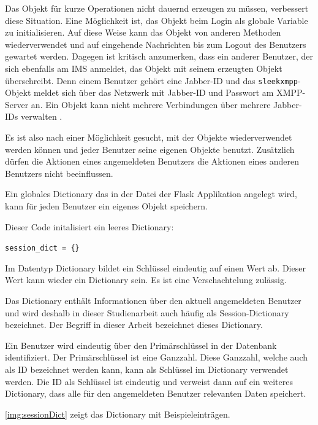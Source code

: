 \documentclass[a4paper,titlepage,halfparskip,12pt]{scrreprt}
\begin{document}
\begin{onehalfspacing}
Das Objekt für kurze Operationen nicht dauernd erzeugen zu müssen, verbessert diese Situation. Eine Möglichkeit ist, das Objekt beim Login als globale Variable zu initialisieren. Auf diese Weise kann das Objekt von anderen Methoden wiederverwendet und auf eingehende Nachrichten bis zum Logout des Benutzers gewartet werden. Dagegen ist kritisch anzumerken, dass ein anderer Benutzer, der sich ebenfalls am \acs{IMS} anmeldet, das Objekt mit seinem erzeugten Objekt überschreibt. Denn einem Benutzer gehört eine Jabber-ID und das \texttt{sleekxmpp}-Objekt meldet sich über das Netzwerk mit Jabber-ID und Passwort am \acs{XMPP}-Server an. Ein Objekt kann nicht mehrere Verbindungen über mehrere Jabber-IDs verwalten \cite{pythonSleekxmpp}.

Es ist also nach einer Möglichkeit gesucht, mit der Objekte wiederverwendet werden können und jeder Benutzer seine eigenen Objekte benutzt. Zusätzlich dürfen die Aktionen eines angemeldeten Benutzers die Aktionen eines anderen Benutzers nicht beeinflussen.

Ein globales Dictionary das in der Datei der Flask Applikation angelegt wird, kann für jeden Benutzer ein eigenes Objekt speichern.

Dieser Code initalisiert ein leeres Dictionary:

\texttt{session\_dict = \{\}}

Im Datentyp Dictionary bildet ein Schlüssel eindeutig auf einen Wert ab. Dieser Wert kann wieder ein Dictionary sein. Es ist eine Verschachtelung zulässig.\cite{pythonDictionaries}

Das Dictionary enthält Informationen über den aktuell angemeldeten Benutzer und wird deshalb in dieser Studienarbeit auch häufig als Session-Dictionary bezeichnet. Der Begriff in dieser Arbeit bezeichnet dieses Dictionary.

Ein Benutzer wird eindeutig über den Primärschlüssel in der Datenbank identifiziert. Der Primärschlüssel ist eine Ganzzahl. Diese Ganzzahl, welche auch als ID bezeichnet werden kann, kann als Schlüssel im Dictionary verwendet werden. Die ID als Schlüssel ist eindeutig und verweist dann auf ein weiteres Dictionary, dass alle für den angemeldeten Benutzer relevanten Daten speichert.

\pagebreak

\autoref{img:sessionDict} zeigt das Dictionary mit Beispieleinträgen.


\end{onehalfspacing}
\end{document}
